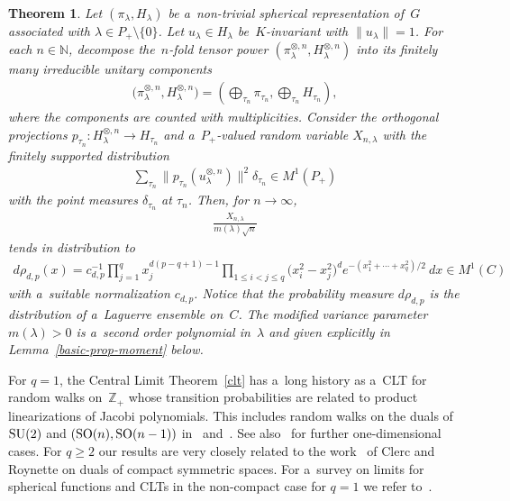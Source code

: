 \documentclass[pdftex]{sigma}
\numberwithin{equation}{section}
\newtheorem{Theorem}{Theorem}[section]
\begin{document}
\begin{Theorem}
\label{clt-spezial}
Let $(\pi_\lambda,H_\lambda)$ be a~non-trivial spherical representation of~$G$ associated with $\lambda\in
P_+\setminus\{0\}$.
Let $u_\lambda\in H_\lambda$ be~$K$-invariant with $\|u_\lambda\|=1$.
For each $n\in \mathbb N$, decompose the~$n$-fold tensor power $(\pi_\lambda^{\otimes, n},H_\lambda^{\otimes, n})$ into
its finitely many irreducible unitary components
\begin{gather*}
\big(\pi_\lambda^{\otimes, n},H_\lambda^{\otimes, n}\big)=\left(\bigoplus_{\tau_n}\pi_{\tau_n}, \bigoplus_{\tau_n}H_{\tau_n}\right),
\end{gather*}
where the components are counted with multiplicities.
Consider the orthogonal projections $p_{\tau_n}:H_\lambda^{\otimes, n}\to H_{\tau_n}$ and a~$P_+$-valued random variable
$X_{n,\lambda}$ with the finitely supported distribution
\begin{gather*}
\sum\limits_{\tau_n}\big\|p_{\tau_n}(u_\lambda^{\otimes, n})\big\|^2 \delta_{\tau_n}\in M^1(P_+)
\end{gather*}
with the point measures $\delta_{\tau_n}$ at $\tau_n$.
Then, for $n\to\infty$,
\begin{gather*}
\frac{X_{n,\lambda}}{m(\lambda) \sqrt n}
\end{gather*}
tends in distribution to
\begin{gather*}
d\rho_{d,p}(x)= c_{d,p}^{-1} \prod\limits_{j=1}^q x_j^{d(p-q+1)-1}  \prod\limits_{1\le i<j\le q}\big(x_i^2-x_j^2\big)^d
  e^{-(x_1^2+\cdots+x_q^2)/2}\> dx
\in M^1(C)
\end{gather*}
with a~suitable normalization $ c_{d,p}$.
Notice that the probability measure $d\rho_{d,p}$ is the distribution of a~Laguerre ensemble on~$C$.
The modified variance parameter $m(\lambda)>0$ is a~second order polynomial in~$\lambda$ and given explicitly in
Lemma~{\rm \ref{basic-prop-moment}} below.
\end{Theorem}

For $q=1$, the Central Limit Theorem~\ref{clt} has a~long history as a~CLT for random walks on~$\mathbb Z_+$ whose
transition probabilities are related to product linearizations of Jacobi polynomials.
This includes random walks on the duals of ${\rm SU}(2)$ and $({\rm SO}(n),{\rm SO}(n-1))$ in~\cite{ER} and~\cite{Ga}.
See also~\cite{V1} for further one-dimensional cases.
For $q\ge2$ our results are very closely related to the work~\cite{CR} of Clerc and Roynette on duals of compact
symmetric spaces.
For a~survey on limits for spherical functions and CLTs in the non-compact case for $q=1$ we refer to~\cite{V2}.
\end{document}

